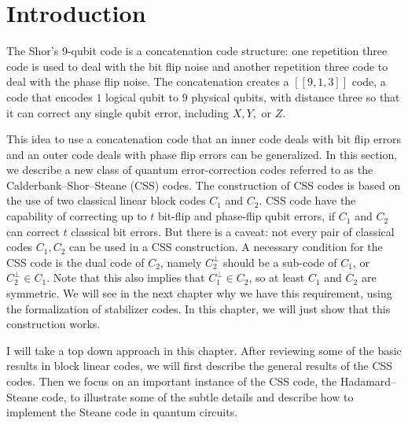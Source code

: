 \Contributor{}

\lstset{style=mystyle}


	\MakeScribeTop


\section{Introduction}
The Shor's 9-qubit code is a concatenation code structure: one repetition three code is used to deal with the bit flip noise and another repetition three code to deal with the phase flip noise. The concatenation creates a \([[9, 1, 3]]\) code, a code that encodes \(1\) logical qubit to \(9\) physical qubits, with distance three so that it can correct any single qubit error, including \(X, Y, \) or \(Z\).

This idea to use a concatenation code that an inner code deals with bit flip errors and an outer code deals with phase flip errors can be generalized. In this section, we describe a new class of quantum error-correction codes referred to as the Calderbank–Shor–Steane (CSS) codes. The construction of CSS codes is based on the use of two classical linear block codes \(C_1\) and \(C_2\). CSS code have the capability of correcting up to \(t\) bit-flip and phase-flip qubit errors, if \(C_1\) and \(C_2\) can correct \(t\) classical bit errors. But there is a caveat: not every pair of classical codes \(C_1, C_2\) can be used in a CSS construction. A necessary condition for the CSS code is the dual code of \(C_2\), namely \(C_2^{\perp}\) should be a sub-code of \(C_1\), or \(C_2^{\perp} \in C_1\). Note that this also implies that \(C_1^{\perp} \in C_2\), so at least \(C_1\) and \(C_2\) are symmetric. We will see in the next chapter why we have this requirement, using the formalization of stabilizer codes. In this chapter, we will just show that this construction works.  


I will take a top down approach in this chapter. After reviewing some of the basic results in block linear codes, we will first describe the general results of the CSS codes. Then we focus on an important instance of the CSS code, the Hadamard–Steane code, to illustrate some of the subtle details and describe how to implement the Steane code in quantum circuits. 


